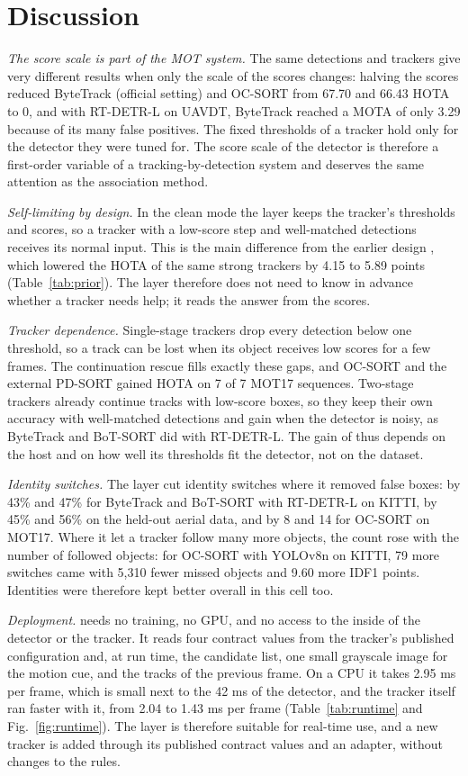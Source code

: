 \section{Discussion}\label{sec:discussion}

\emph{The score scale is part of the MOT system.} The same detections and trackers give very
different results when only the scale of the scores changes: halving the scores reduced ByteTrack
(official setting) and OC-SORT from 67.70 and 66.43 HOTA to 0, and with RT-DETR-L on UAVDT, ByteTrack
reached a MOTA of only 3.29 because of its many false positives. The fixed thresholds of a tracker
hold only for the detector they were tuned for. The score scale of the detector is therefore a
first-order variable of a tracking-by-detection system and deserves the same attention as the
association method.

\emph{Self-limiting by design.} In the clean mode the layer keeps the tracker's thresholds and
scores, so a tracker with a low-score step and well-matched detections receives its normal input.
This is the main difference from the earlier design \aob{}, which lowered the HOTA of the same
strong trackers by 4.15 to 5.89 points (Table~\ref{tab:prior}). The layer therefore does not need
to know in advance whether a tracker needs help; it reads the answer from the scores.

\emph{Tracker dependence.} Single-stage trackers drop every detection below one threshold, so a
track can be lost when its object receives low scores for a few frames. The continuation rescue
fills exactly these gaps, and OC-SORT and the external PD-SORT gained HOTA on 7 of 7 MOT17 sequences.
Two-stage trackers already continue tracks with low-score boxes, so they keep their own accuracy
with well-matched detections and gain when the detector is noisy, as ByteTrack and BoT-SORT did with
RT-DETR-L. The gain of \scl{} thus depends on the host and on how well its thresholds fit the
detector, not on the dataset.

\emph{Identity switches.} The layer cut identity switches where it removed false boxes: by 43\% and
47\% for ByteTrack and BoT-SORT with RT-DETR-L on KITTI, by 45\% and 56\% on the held-out aerial
data, and by 8 and 14 for OC-SORT on MOT17. Where it let a tracker follow many more objects, the
count rose with the number of followed objects: for OC-SORT with YOLOv8n on KITTI, 79 more switches
came with 5,310 fewer missed objects and 9.60 more IDF1 points. Identities were therefore kept
better overall in this cell too.

\emph{Deployment.} \scl{} needs no training, no GPU, and no access to the inside of the detector or
the tracker. It reads four contract values from the tracker's published configuration and, at run
time, the candidate list, one small grayscale image for the motion cue, and the tracks of the
previous frame. On a CPU it takes 2.95 ms per frame, which is small next to the 42 ms of the
detector, and the tracker itself ran faster with it, from 2.04 to 1.43 ms per frame
(Table~\ref{tab:runtime} and Fig.~\ref{fig:runtime}). The layer is therefore suitable for real-time
use, and a new tracker is added through its published contract values and an adapter, without
changes to the rules.
